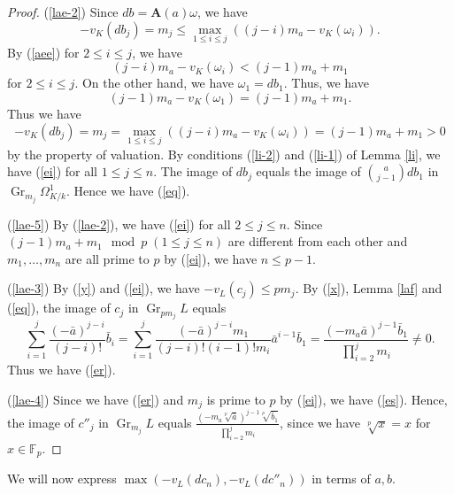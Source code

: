 \documentclass[sn-mathphys-num]{sn-jnl}
\numberwithin{equation}{section}
\newcommand{\Gr}{\operatorname{Gr}}
\theoremstyle{plain}
\theoremstyle{definition}
\begin{document}
\begin{proof}
  (\ref{lae-2}) Since $db=\mathbf{A}(a)\omega$, we have 
  \begin{equation}
  -v_K(db_j)=m_j\leq\max_{1\leq i\leq j}((j-i)m_a-v_K(\omega_i)).
  \end{equation}
  By (\ref{aee}) for $2\leq i\leq j$, we have
  \begin{equation}
  (j-i)m_a-v_K(\omega_i)<(j-1)m_a+m_1
  \end{equation}
  for $2\leq i\leq j$. On the other hand, we have $\omega_1=db_1$. Thus, we have
  \begin{equation}
  (j-1)m_a-v_K(\omega_1)=(j-1)m_a+m_1.
  \end{equation}
  Thus we have
  \begin{equation}
    -v_K(db_j)=m_j=\max_{1\leq i\leq j}((j-i)m_a-v_K(\omega_i))=(j-1)m_a+m_1>0
  \end{equation}
  by the property of valuation. By conditions (\ref{li-2}) and (\ref{li-1}) of Lemma \ref{li}, we have (\ref{ei}) for all $1\leq j\leq n$. The image of $db_j$ equals the image of $\displaystyle{\binom{a}{j-1}db_1}$ in $\Gr_{m_j}\Omega_{K/k}^1$. Hence we have (\ref{eq}).




  (\ref{lae-5}) By (\ref{lae-2}), we have (\ref{ei}) for all $2\leq j\leq n$. Since $(j-1)m_a+m_1\mod p\;(1\leq j\leq n)$ are different from each other and $m_1,\ldots,m_n$ are all prime to $p$ by (\ref{ei}), we have $n\leq p-1$.
  
  (\ref{lae-3}) By (\ref{y}) and (\ref{ei}), we have $-v_L(c_j)\leq pm_j$.  By (\ref{x}), Lemma \ref{laf} and (\ref{eq}), the image of $c_j$ in $\Gr_{pm_j}L$ equals
  \begin{equation}
  \sum_{i=1}^j\frac{(-\bar{a})^{j-i}}{(j-i)!}\bar{b}_i=\sum_{i=1}^j\frac{(-\bar{a})^{j-i}m_1}{(j-i)!(i-1)!m_i}\bar{a}^{i-1}\bar{b}_1
  =\frac{(-m_a\bar{a})^{j-1}\bar{b}_1}{\prod_{i=2}^jm_i}\neq 0.
  \end{equation}
  Thus we have (\ref{er}).

  (\ref{lae-4}) Since we have (\ref{er}) and $m_j$ is prime to $p$ by (\ref{ei}), we have (\ref{es}). Hence, the image of $c''_j$ in $\Gr_{m_j}L$ equals $\displaystyle{\frac{\left(-m_a\sqrt[p]{\bar{a}}\right)^{j-1}\sqrt[p]{\bar{b}_1}}{\prod_{i=2}^jm_i}}$, since we have $\sqrt[p]{x}=x$ for $x\in\mathbb{F}_p$.
\end{proof}

We will now express $\max(-v_L(dc_n),-v_L(dc''_n))$ in terms of $a,b$.
\end{document}
